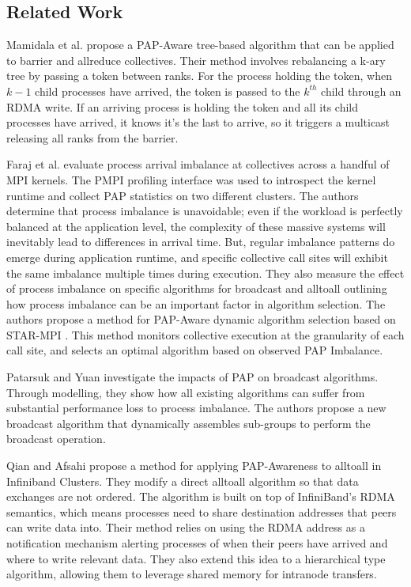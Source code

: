 \subsection{Related Work}

Mamidala et al. \cite{Mamidala2004BarrierAllreduceIBAdaptive} propose a PAP-Aware tree-based algorithm that can be applied to barrier and allreduce collectives.
Their method involves rebalancing a k-ary tree by passing a token between ranks.
For the process holding the token, when $k-1$ child processes have arrived, the token is passed to the $k^{th}$ child through an RDMA write.
If an arriving process is holding the token and all its child processes have arrived, it knows it's the last to arrive, so it triggers a multicast releasing all ranks from the barrier. 

Faraj et al. \cite{Faraj2008StudyProcArrivalMPIColl} evaluate process arrival imbalance at collectives across a handful of MPI kernels.
The PMPI profiling interface was used to introspect the kernel runtime and collect PAP statistics on two different clusters.
The authors determine that process imbalance is unavoidable; even if the workload is perfectly balanced at the application level, the complexity of these massive systems will inevitably lead to differences in arrival time. 
But, regular imbalance patterns do emerge during application runtime, and specific collective call sites will exhibit the same imbalance multiple times during execution.
They also measure the effect of process imbalance on specific algorithms for broadcast and alltoall outlining how process imbalance can be an important factor in algorithm selection.
The authors propose a method for PAP-Aware dynamic algorithm selection based on STAR-MPI \cite{Faraj2006StarMPI}.
This method monitors collective execution at the granularity of each call site, and selects an optimal algorithm based on observed PAP Imbalance. 

Patarsuk and Yuan \cite{Patarasuk2008EffBcastDifProcArr} investigate the impacts of PAP on broadcast algorithms.
Through modelling, they show how all existing algorithms can suffer from substantial performance loss to process imbalance. 
The authors propose a new broadcast algorithm that dynamically assembles sub-groups to perform the broadcast operation.

Qian and Afsahi \cite{Qian2009ProcArrivalSHMA2AIB} propose a method for applying PAP-Awareness to alltoall in Infiniband Clusters.
They modify a direct alltoall algorithm so that data exchanges are not ordered.
The algorithm is built on top of InfiniBand's RDMA semantics, which means processes need to share destination addresses that peers can write data into. 
Their method relies on using the RDMA address as a notification mechanism alerting processes of when their peers have arrived and where to write relevant data.
They also extend this idea to a hierarchical type algorithm, allowing them to leverage shared memory for intranode transfers.

